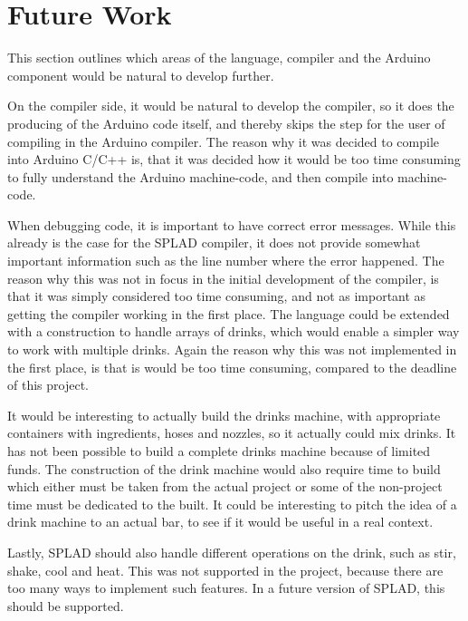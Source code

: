 \section{Future Work}
This section outlines which areas of the language, compiler and the Arduino component would be natural to develop further.

On the compiler side, it would be natural to develop the compiler, so it does the producing of the Arduino code itself, and thereby skips the step for the user of compiling in the Arduino compiler. The reason why it was decided to compile into Arduino C/C++ is, that it was decided how it would be too time consuming to fully understand the Arduino machine-code, and then compile into machine-code.

When debugging code, it is important to have correct error messages. While this already is the case for the SPLAD compiler, it does not provide somewhat important information such as the line number where the error happened. The reason why this was not in focus in the initial development of the compiler, is that it was simply considered too time consuming, and not as important as getting the compiler working in the first place. The language could be extended with a construction to handle arrays of drinks, which would enable a simpler way to work with multiple drinks. Again the reason why this was not implemented in the first place, is that is would be too time consuming, compared to the deadline of this project.

It would be interesting to actually build the drinks machine, with appropriate containers with ingredients, hoses and nozzles, so it actually could mix drinks. It has not been possible to build a complete drinks machine because of limited funds. The construction of the drink machine would also require time to build which either must be taken from the actual project or some of the non-project time must be dedicated to the built. It could be interesting to pitch the idea of a drink machine to an actual bar, to see if it would be useful in a real context.

Lastly, SPLAD should also handle different operations on the drink, such as stir, shake, cool and heat. This was not supported in the project, because there are too many ways to implement such features. In a future version of SPLAD, this should be supported.